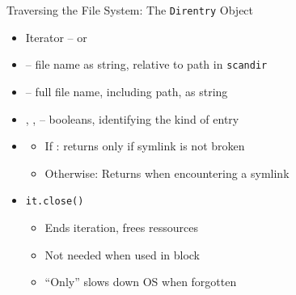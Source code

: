 
\begin{frame}{Traversing the File System: The \texttt{Direntry} Object}
%
\begin{itemize}
\item Iterator --  or 
\item {} -- file name as string, relative to path in \texttt{scandir}
\item {} -- full file name, including path, as string
\item {}, ,  -- booleans, identifying the kind of entry
\item {}
	\begin{itemize}
	\item If : returns  only if symlink is not broken
	\item Otherwise: Returns  when encountering a symlink
	\end{itemize}
\item \texttt{it.close()}
	\begin{itemize}
	\item Ends iteration, frees ressources
	\item Not needed when used in  block
	\item \enquote{Only} slows down OS when forgotten
	\end{itemize}
\end{itemize}
%
\end{frame}


